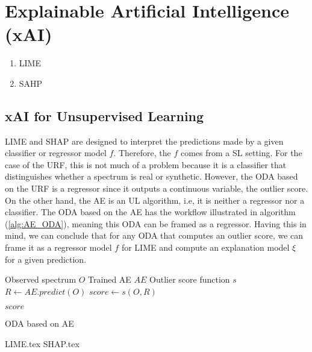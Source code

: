 \section{E\textbf{x}plainable \textbf{A}rtificial \textbf{I}ntelligence (xAI)}

\begin{enumerate}

  \item LIME

  \item SAHP
\end{enumerate}

\subsection{xAI for Unsupervised Learning}

LIME and SHAP are designed to interpret the predictions made by a given
classifier or regressor model $f$. Therefore, the $f$ comes from a SL setting.
For the case of the URF, this is not much of a problem because it is a
classifier that distinguishes whether a spectrum is real or synthetic. However,
the ODA based on the URF is a regressor since it outputs a continuous variable,
the outlier score. On the other hand, the AE is an UL algorithm, i.e, it is
neither a regressor nor a classifier. The ODA based on the AE has the workflow
illustrated in algorithm (\ref{alg:AE_ODA}), meaning this ODA can be framed as
a regressor. Having this in mind, we can conclude that for any ODA that computes
an outlier score, we can frame it as a regressor model $f$ for LIME and compute
an explanation model $\xi$ for a given prediction.

\begin{algorithm}[tb]
\begin{algorithmic}
  \Require Observed spectrum $O$
  \Require Trained AE $AE$
  \Require Outlier score function $s$
  \State $R \gets AE.predict(O)$ 
  \State $score \gets s(O,R)$  

  \Return $score$
\end{algorithmic}
\caption{ODA based on AE\label{alg:AE_ODA}}
\end{algorithm}

{LIME.tex}
{SHAP.tex}
